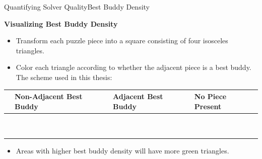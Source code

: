\documentclass[10pt]{beamer}
\begin{document}
\begin{frame}{Quantifying Solver Quality}{Best Buddy Density}  
  \begin{block}{\textbf{Visualizing Best Buddy Density}}
    \begin{itemize}
      \setlength\itemsep{1em}
      \item Transform each puzzle piece into a square consisting of four isosceles triangles.
      \item Color each triangle according to whether the adjacent piece is a best buddy.  The scheme used in this thesis:
    \end{itemize}
    \begin{table}
      \begin{center}
        \begin{tabular}{ | >{\centering\arraybackslash}m{0.62in} | >{\centering\arraybackslash}m{0.78in} | >{\centering\arraybackslash}m{0.7in} | >{\centering\arraybackslash}m{0.62in} | }
              
          \hline
          {\small No Best Buddy} & {\small Non-Adjacent Best Buddy} & {\small Adjacent Best Buddy} & {\small No Piece Present}  \\ \hline
          {\cellcolor{white}~} & {\cellcolor{red}~} & {\cellcolor{green}~} & {\cellcolor{black}~}  \\
          {\cellcolor{white}~} & {\cellcolor{red}~} & {\cellcolor{green}~} & {\cellcolor{black}~}  \\
          \hline
        \end{tabular}
      \end{center}
    \end{table}
    \begin{itemize}
      \setlength\itemsep{1em}
      \item Areas with higher best buddy density will have more green triangles.
    \end{itemize}
  \end{block}
\end{frame}
\end{document}
